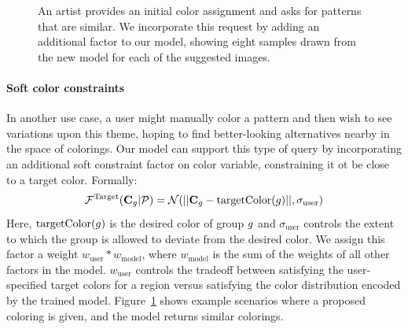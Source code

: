 \begin{figure}[ht]
\caption{An artist provides an initial color assignment and asks for patterns that are similar. We incorporate this request by adding an additional factor to our model, showing eight samples drawn from the new model for each of the suggested images.~}
\label{fig:nearbySuggestions}
\vspace{-1.0em}
\end{figure}

\paragraph{Soft color constraints}
In another use case, a user might manually color a pattern and then wish to see variations upon this theme, hoping to find better-looking alternatives nearby in the space of colorings. Our model can support this type of query by incorporating an additional soft constraint factor on color variable, constraining it ot be close to a target color. Formally: 
\begin{equation}
\mathcal{F}^\textrm{Target}(\mathbf{C}_g | \mathcal{P}) = \mathcal{N}(||\mathbf{C}_g - \textrm{targetColor}(g)||, \sigma_\textrm{user})
\label{eq:targetFactor}
\end{equation}
Here, $\textrm{targetColor}(g)$ is the desired color of group $g$ and $\sigma_\textrm{user}$ controls the extent to which the group is allowed to deviate from the desired color. We assign this factor a weight $w_\textrm{user} * w_\textrm{model}$, where $w_\textrm{model}$ is the sum of the weights of all other factors in the model. $w_\textrm{user}$ controls the tradeoff between satisfying the user-specified target colors for a region versus satisfying the color distribution encoded by the trained model.
%
Figure~\ref{fig:nearbySuggestions} shows example scenarios where a proposed coloring is given, and the model returns similar colorings.%

